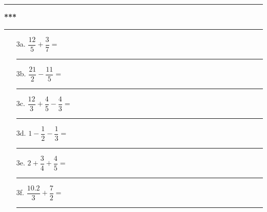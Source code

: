 \documentclass[12pt]{article}
\begin{document}
\vspace{0.2cm}
\rule{0.48\linewidth}{1pt} \textbf{***} \rule{0.48\linewidth}{1pt}
\vspace{0.2cm}

\begin{enumerate}
\item[3a.] $\dfrac{12}{5} + \dfrac{3}{7}  =$\\
\rule{\linewidth}{0.5pt}
\item[3b.] $\dfrac{21}{2} - \dfrac{11}{5} =$\\
\rule{\linewidth}{0.5pt}
\item[3c.] $\dfrac{12}{3} + \dfrac{4}{5}  - \dfrac{4}{3} =$\\
\rule{\linewidth}{0.5pt}
\item[3d.] $            1 - \dfrac{1}{2}  - \dfrac{1}{3} =$\\
\rule{\linewidth}{0.5pt}
\item[3e.] $            2 + \dfrac{3}{4}  +\dfrac{4}{5}  =$\\
\rule{\linewidth}{0.5pt}
\item[3f.] $\dfrac{10.2}{3}  + \dfrac{7}{2} =$\\
\rule{\linewidth}{0.5pt}
\end{enumerate}
\end{document}
